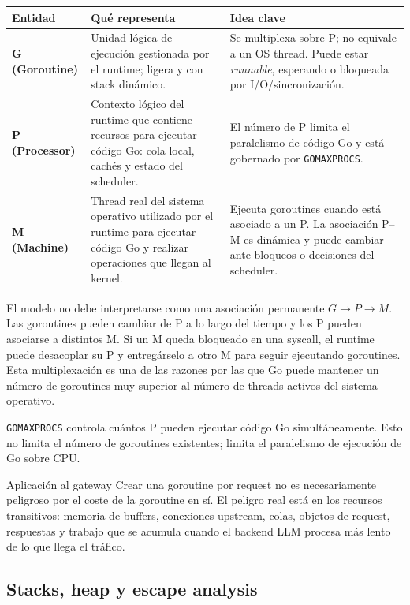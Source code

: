 \documentclass[11pt,a4paper]{article}
\newcommand{\code}[1]{\texttt{#1}}
\begin{document}
\begin{center}
\small
\renewcommand{\arraystretch}{1.18}
\begin{tabularx}{0.98\textwidth}{@{}>{\bfseries}p{2.0cm} X X@{}}
\toprule
Entidad & Qué representa & Idea clave \\
\midrule
G (Goroutine) & Unidad lógica de ejecución gestionada por el runtime; ligera y con stack dinámico. & Se multiplexa sobre P; no equivale a un OS thread. Puede estar \emph{runnable}, esperando o bloqueada por I/O/sincronización. \\
P (Processor) & Contexto lógico del runtime que contiene recursos para ejecutar código Go: cola local, cachés y estado del scheduler. & El número de P limita el paralelismo de código Go y está gobernado por \code{GOMAXPROCS}. \\
M (Machine) & Thread real del sistema operativo utilizado por el runtime para ejecutar código Go y realizar operaciones que llegan al kernel. & Ejecuta goroutines cuando está asociado a un P. La asociación P--M es dinámica y puede cambiar ante bloqueos o decisiones del scheduler. \\
\bottomrule
\end{tabularx}
\end{center}

El modelo no debe interpretarse como una asociación permanente \(G \rightarrow P \rightarrow M\). Las goroutines pueden cambiar de P a lo largo del tiempo y los P pueden asociarse a distintos M. Si un M queda bloqueado en una syscall, el runtime puede desacoplar su P y entregárselo a otro M para seguir ejecutando goroutines. Esta multiplexación es una de las razones por las que Go puede mantener un número de goroutines muy superior al número de threads activos del sistema operativo.

\code{GOMAXPROCS} controla cuántos P pueden ejecutar código Go simultáneamente. Esto no limita el número de goroutines existentes; limita el paralelismo de ejecución de Go sobre CPU.

\begin{engineeringbox}{Aplicación al gateway}
Crear una goroutine por request no es necesariamente peligroso por el coste de la goroutine en sí. El peligro real está en los recursos transitivos: memoria de buffers, conexiones upstream, colas, objetos de request, respuestas y trabajo que se acumula cuando el backend LLM procesa más lento de lo que llega el tráfico.
\end{engineeringbox}

\subsection{Stacks, heap y escape analysis}
\end{document}
